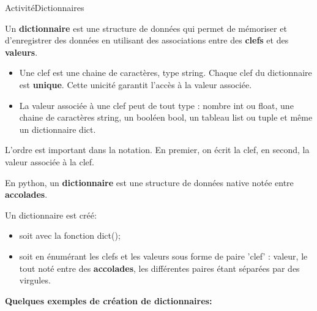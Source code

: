 \documentclass[12pt,a4paper]{article}
\begin{document}
\begin{NSI}
{Activité}{Dictionnaires}
\end{NSI}


Un \textbf{dictionnaire} est une structure de données qui permet de mémoriser et d'enregistrer des données en utilisant des associations entre des \textbf{clefs} et des \textbf{valeurs}.

\begin{itemize}[label=\textbullet]
\item Une \textsf{clef} est une chaine de caractères, type \textsf{string}. Chaque \textsf{clef} du dictionnaire est \textbf{unique}. Cette unicité garantit l'accès à la valeur associée.

\item La \textsf{valeur} associée à une \textsf{clef} peut de tout type : nombre \textsf{int} ou \textsf{float}, une chaine de caractères \textsf{string}, un booléen \textsf{bool}, un tableau \textsf{list} ou \textsf{tuple} et même un dictionnaire \textsf{dict}.
\end{itemize}

L'ordre est important dans la notation. En premier, on écrit la \textsf{clef}, en second, la \textsf{valeur} associée à la clef.

En python, un \textbf{dictionnaire} est une structure de données native notée entre \textbf{accolades}. 

Un dictionnaire est créé:

\begin{itemize}[label=\textbullet]
\item soit avec la fonction \textsf{dict()};

\item soit en énumérant les clefs et les valeurs sous forme de paire \textsf{'clef' : valeur}, le tout noté entre des \textbf{accolades}, les différentes paires étant séparées par des virgules.
\end{itemize}

\textbf{Quelques exemples de création de dictionnaires:}
\end{document}
